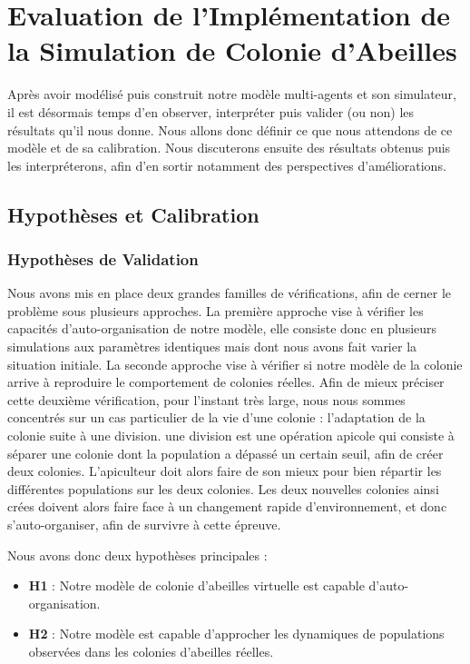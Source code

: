 \chapter{Evaluation de l'Implémentation de la Simulation de Colonie d'Abeilles}
\label{ChapitreEvalSMA}
	Après avoir modélisé puis construit notre modèle multi-agents et son simulateur, il est désormais temps d'en observer, interpréter puis valider (ou non) les résultats qu'il nous donne. Nous allons donc définir ce que nous attendons de ce modèle et de sa calibration. Nous discuterons ensuite des résultats obtenus puis les interpréterons, afin d'en sortir notamment des perspectives d'améliorations.
	
	\section{Hypothèses et Calibration}
		\subsection{Hypothèses de Validation}
			Nous avons mis en place deux grandes familles de vérifications, afin de cerner le problème sous plusieurs approches. La première approche vise à vérifier les capacités d'auto-organisation de notre modèle, elle consiste donc en plusieurs simulations aux paramètres identiques mais dont nous avons fait varier la situation initiale. La seconde approche vise à vérifier si notre modèle de la colonie arrive à reproduire le comportement de colonies réelles. Afin de mieux préciser cette deuxième vérification, pour l'instant très large, nous nous sommes concentrés sur un cas particulier de la vie d'une colonie : l'adaptation de la colonie suite à une division. une division est une opération apicole qui consiste à séparer une colonie dont la population a dépassé un certain seuil, afin de créer deux colonies. L'apiculteur doit alors faire de son mieux pour bien répartir les différentes populations sur les deux colonies. Les deux nouvelles colonies ainsi crées doivent alors faire face à un changement rapide d'environnement, et donc s'auto-organiser, afin de survivre à cette épreuve.
			
			Nous avons donc deux hypothèses principales :
			\begin{itemize}
				\item \textbf{H1} : Notre modèle de colonie d'abeilles virtuelle est capable d'auto-organisation.
				\item \textbf{H2} : Notre modèle est capable d'approcher les dynamiques de populations observées dans les colonies d'abeilles réelles.
			\end{itemize}
			
